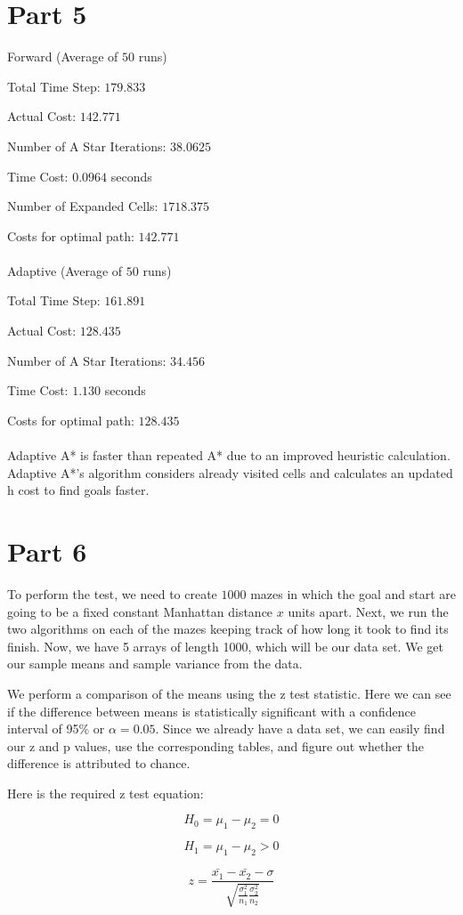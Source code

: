\documentclass{article}
\begin{document}
\section*{Part 5}

Forward (Average of $50$ runs)

Total Time Step: $179.833$

Actual Cost: $142.771$

Number of A Star Iterations: $38.0625$

Time Cost: $0.0964$ seconds

Number of Expanded Cells: $1718.375$

Costs for optimal path: $142.771$
\\
\\Adaptive (Average of $50$ runs)

Total Time Step: $161.891$

Actual Cost: $128.435$

Number of A Star Iterations: $34.456$

Time Cost: $1.130$ seconds

Costs for optimal path: $128.435$
\\
\\Adaptive A* is faster than repeated A* due to an improved heuristic calculation. Adaptive A*'s algorithm considers already visited cells and calculates an updated h cost to find goals faster.

\section*{Part 6}

To perform the test, we need to create $1000$ mazes in which the goal and start are going to be a fixed constant Manhattan distance $x$ units apart. Next, we run the two algorithms on each of the mazes keeping track of how long it took to find its finish. Now, we have 5 arrays of length 1000, which will be our data set. We get our sample means and sample variance from the data.

We perform a comparison of the means using the z test statistic. Here we can see if the difference between means is statistically significant with a confidence interval of 95\% or $\alpha=0.05$. Since we already have a data set, we can easily find our z and p values, use the corresponding tables, and figure out whether the difference is attributed to chance.

Here is the required z test equation:

\[H_0=\mu_1-\mu_2=0\]

\[H_1=\mu_1-\mu_2>0\]

\[z = \frac{\bar{x_1}- \bar{x_2}-\sigma}{\sqrt{\frac{\sigma_1^2}{n_1}\frac{\sigma_2^2}{n_2}}}\]
\end{document}
